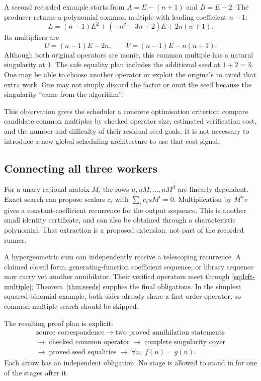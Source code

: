 A second recorded example starts from
$A=E-(n+1)$ and $B=E-2$. The producer returns a polynomial common multiple with
leading coefficient $n-1$:
\[
L=(n-1)E^2+(-n^2-3n+2)E+2n(n+1).
\]
Its multipliers are
\[
U=(n-1)E-2n,\qquad V=(n-1)E-n(n+1).
\]
Although both original operators are monic, this common multiple has a natural
singularity at $1$. The safe equality plan includes the additional seed at
$1+2=3$. One may be able to choose another operator or exploit the originals to
avoid that extra work. One may not simply discard the factor or omit the seed
because the singularity ``came from the algorithm''.

This observation gives the scheduler a concrete optimisation criterion:
compare candidate common multiples by checked operator size, estimated
verification cost, and the number and difficulty of their residual seed goals.
It is not necessary to introduce a new global scheduling architecture to use
that cost signal.

\subsection{Connecting all three workers}

For a unary rational matrix $M$, the rows
$u,uM,\ldots,uM^d$ are linearly dependent. Exact search can propose scalars
$c_i$ with $\sum_i c_i uM^i=0$. Multiplication by $M^nv$ gives a
constant-coefficient recurrence for the output sequence. This is another small
identity certificate, and can also be obtained through a characteristic
polynomial. That extraction is a proposed extension, not part of the recorded
runner.

A hypergeometric sum can independently receive a telescoping recurrence.
A claimed closed form, generating-function coefficient sequence, or library
sequence may carry yet another annihilator. Their verified operators meet
through \eqref{eq:left-multiple}; Theorem~\ref{thm:seeds} supplies the final
obligations. In the simplest squared-binomial example, both sides already share
a first-order operator, so common-multiple search should be skipped.

The resulting proof plan is explicit:
\[
\begin{gathered}
\text{source correspondence}\;\longrightarrow\;
\text{two proved annihilation statements}\\
\longrightarrow\;\text{checked common operator}\;
\longrightarrow\;\text{complete singularity cover}\\
\longrightarrow\;\text{proved seed equalities}\;
\longrightarrow\;\forall n,\ f(n)=g(n).
\end{gathered}
\]
Each arrow has an independent obligation. No stage is allowed to stand in for
one of the stages after it.

